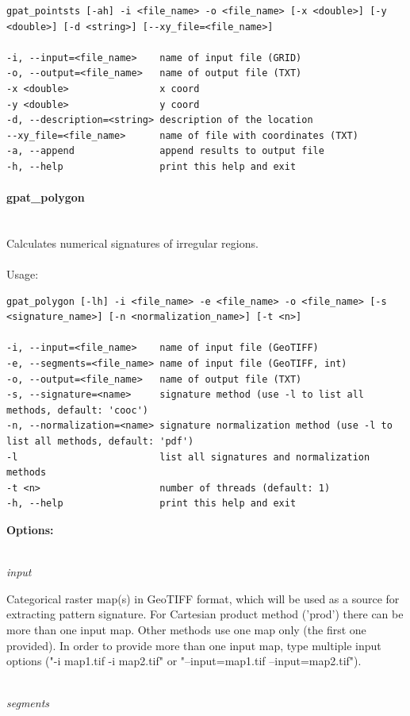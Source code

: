 \documentclass[12pt,margin=0.5in]{article}
\newcommand{\newparagraph}[1]{\paragraph{#1}\mbox{}\\}
\newcommand{\newoption}[1]{\mbox{}\\{\it #1}}
\begin{document}
\begin{minipage}{\linewidth}
\begin{lstlisting}
gpat_pointsts [-ah] -i <file_name> -o <file_name> [-x <double>] [-y <double>] [-d <string>] [--xy_file=<file_name>]

-i, --input=<file_name>    name of input file (GRID)
-o, --output=<file_name>   name of output file (TXT)
-x <double>                x coord
-y <double>                y coord
-d, --description=<string> description of the location
--xy_file=<file_name>      name of file with coordinates (TXT)
-a, --append               append results to output file
-h, --help                 print this help and exit
\end{lstlisting}
\end{minipage}

\newparagraph{gpat\_polygon}
Calculates numerical signatures of irregular regions.
\\\\
Usage:

\begin{minipage}{\linewidth}
\begin{lstlisting}
gpat_polygon [-lh] -i <file_name> -e <file_name> -o <file_name> [-s <signature_name>] [-n <normalization_name>] [-t <n>]

-i, --input=<file_name>    name of input file (GeoTIFF)
-e, --segments=<file_name> name of input file (GeoTIFF, int)
-o, --output=<file_name>   name of output file (TXT)
-s, --signature=<name>     signature method (use -l to list all methods, default: 'cooc')
-n, --normalization=<name> signature normalization method (use -l to list all methods, default: 'pdf')
-l                         list all signatures and normalization methods
-t <n>                     number of threads (default: 1)
-h, --help                 print this help and exit
\end{lstlisting}
\end{minipage}

{\bf Options:}

\newoption{input}

Categorical raster map(s) in GeoTIFF format, which will be used as a source for extracting pattern signature. For Cartesian product method ('prod') there can be more than one input map. Other methods use one map only (the first one provided). In order to provide more than one input map, type multiple input options ("-i map1.tif -i map2.tif" or "--input=map1.tif --input=map2.tif").

\newoption{segments}
\end{document}
